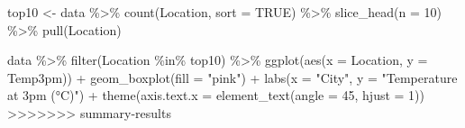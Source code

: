 \documentclass[
  letterpaper,
  DIV=11,
  numbers=noendperiod]{scrartcl}
\newenvironment{Shaded}{\begin{snugshade}}{\end{snugshade}}
\newcommand{\AttributeTok}[1]{\textcolor[rgb]{0.40,0.45,0.13}{#1}}
\newcommand{\ConstantTok}[1]{\textcolor[rgb]{0.56,0.35,0.01}{#1}}
\newcommand{\DecValTok}[1]{\textcolor[rgb]{0.68,0.00,0.00}{#1}}
\newcommand{\FunctionTok}[1]{\textcolor[rgb]{0.28,0.35,0.67}{#1}}
\newcommand{\NormalTok}[1]{\textcolor[rgb]{0.00,0.23,0.31}{#1}}
\newcommand{\OtherTok}[1]{\textcolor[rgb]{0.00,0.23,0.31}{#1}}
\newcommand{\SpecialCharTok}[1]{\textcolor[rgb]{0.37,0.37,0.37}{#1}}
\newcommand{\StringTok}[1]{\textcolor[rgb]{0.13,0.47,0.30}{#1}}
\begin{document}
\begin{Shaded}
\begin{Highlighting}[]
\begin{Shaded}
\begin{Highlighting}[]
\begin{Shaded}
\begin{Highlighting}[]
\begin{Shaded}
\begin{Highlighting}[]
\begin{Shaded}
\begin{Highlighting}[]
\NormalTok{top10 }\OtherTok{\textless{}{-}}\NormalTok{ data }\SpecialCharTok{\%\textgreater{}\%}
  \FunctionTok{count}\NormalTok{(Location, }\AttributeTok{sort =} \ConstantTok{TRUE}\NormalTok{) }\SpecialCharTok{\%\textgreater{}\%}
  \FunctionTok{slice\_head}\NormalTok{(}\AttributeTok{n =} \DecValTok{10}\NormalTok{) }\SpecialCharTok{\%\textgreater{}\%}
  \FunctionTok{pull}\NormalTok{(Location)}

\NormalTok{data }\SpecialCharTok{\%\textgreater{}\%}
  \FunctionTok{filter}\NormalTok{(Location }\SpecialCharTok{\%in\%}\NormalTok{ top10) }\SpecialCharTok{\%\textgreater{}\%}
  \FunctionTok{ggplot}\NormalTok{(}\FunctionTok{aes}\NormalTok{(}\AttributeTok{x =}\NormalTok{ Location, }\AttributeTok{y =}\NormalTok{ Temp3pm)) }\SpecialCharTok{+}
  \FunctionTok{geom\_boxplot}\NormalTok{(}\AttributeTok{fill =} \StringTok{"pink"}\NormalTok{) }\SpecialCharTok{+}
  \FunctionTok{labs}\NormalTok{(}\AttributeTok{x =} \StringTok{"City"}\NormalTok{, }\AttributeTok{y =} \StringTok{"Temperature at 3pm (°C)"}\NormalTok{) }\SpecialCharTok{+}
  \FunctionTok{theme}\NormalTok{(}\AttributeTok{axis.text.x =} \FunctionTok{element\_text}\NormalTok{(}\AttributeTok{angle =} \DecValTok{45}\NormalTok{, }\AttributeTok{hjust =} \DecValTok{1}\NormalTok{))}
>>>>>>> summary-results
\end{Highlighting}
\end{Shaded}

\begin{figure}[H]

\end{figure}
\end{Highlighting}
\end{Shaded}
\end{Highlighting}
\end{Shaded}
\end{Highlighting}
\end{Shaded}
\end{Highlighting}
\end{Shaded}
\end{document}
